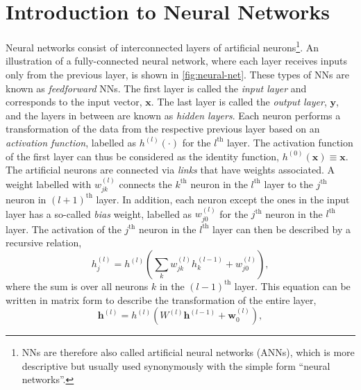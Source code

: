 \section{Introduction to Neural Networks}
\label{sec:intro-neural-nets}
Neural networks consist of interconnected layers of artificial neurons\footnote{ NNs are therefore also called artificial neural networks (ANNs), which is more descriptive but usually used synonymously with the simple form ``neural networks''.}. An illustration of a fully-connected neural network, where each layer receives inputs only from the previous layer, is shown in \cref{fig:neural-net}. These types of NNs are known as \emph{feedforward} NNs.
The first layer is called the \emph{input layer} and corresponds to the input vector, $\mathbf{x}$. The last layer is called the \emph{output layer}, $\mathbf{y}$, and the layers in between are known as \emph{hidden layers}. Each neuron performs a transformation of the data from the respective previous layer based on an \emph{activation function}, labelled as $h^{(l)}(\cdot)$ for the $l^\text{th}$ layer.
The activation function of the first layer can thus be considered as the identity function, $h^{(0)}(\mathbf{x}) \equiv \mathbf{x}$.
The artificial neurons are connected via \emph{links} that have weights associated.
A weight labelled with $w^{(l)}_{jk}$ connects the $k^\text{th}$ neuron in the $l^\text{th}$ layer to the $j^\text{th}$ neuron in $(l+1)^\text{th}$ layer.
In addition, each neuron except the ones in the input layer has a so-called \emph{bias} weight, labelled as $w^{(l)}_{j0}$ for the $j^\text{th}$ neuron in the $l^\text{th}$ layer.
The activation of the $j^\text{th}$ neuron in the $l^{\text{th}}$ layer can then be described by a recursive relation,
\begin{equation}
    h^{(l)}_j =  h^{(l)} \left( \sum_{k}   w^{(l)}_{jk} h^{(l-1)}_{k}  + w^{(l)}_{j0} \right),
\end{equation}
where the sum is over all neurons $k$ in the $(l-1)^\text{th}$ layer.
This equation can be written in matrix form to describe the transformation of the entire layer,
\begin{equation}
    \label{eq:recursive-neuron-activation}
    \mathbf{h}^{(l)} =  h^{(l)} \left( W^{(l)} \mathbf{h}^{(l-1)}  + \mathbf{w}^{(l)}_{0} \right),
\end{equation}
